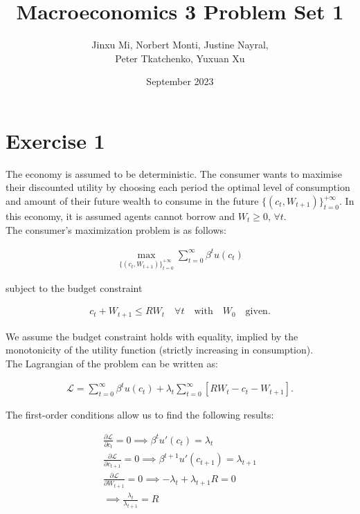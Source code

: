 \documentclass{article}
\title{Macroeconomics 3 Problem Set 1}
\author{Jinxu Mi, Norbert Monti, Justine Nayral, \\ Peter Tkatchenko, Yuxuan Xu}
\date{September 2023}
\begin{document}
\maketitle

\section{Exercise 1}
The economy is assumed to be deterministic. The consumer wants to maximise their discounted utility by choosing each period the optimal level of consumption and amount of their future wealth to consume in the future $\{(c_t, W_{t+1})\}^{+\infty}_{t=0}$. In this economy, it is assumed agents cannot borrow and $W_t \geq 0$, $\forall t$. \\

The consumer's maximization problem is as follows:

\begin{gather*}
    \max_{\{(c_t, W_{t+1})\}^{+\infty}_{t=0}} \sum^\infty_{t=0} \beta^tu(c_t)
\end{gather*}

subject to the budget constraint

\begin{gather*}
    c_t + W_{t+1} \leq RW_t \quad \forall t \quad  \mbox{with} \quad W_0 \quad \mbox{given}.
\end{gather*}

We assume the budget constraint holds with equality, implied by the monotonicity of the utility function (strictly increasing in consumption). \\

The Lagrangian of the problem can be written as:

\begin{gather*}
    \mathcal{L} = \sum^\infty_{t=0} \beta^tu(c_t) + \lambda_t\sum^\infty_{t=0}[RW_t - c_t - W_{t+1}].
\end{gather*}

The first-order conditions allow us to find the following results:

\begin{gather*}
\frac{\partial \mathcal{L}}{\partial c_t} = 0 \implies \beta^tu'(c_t) = \lambda_t \\
\frac{\partial \mathcal{L}}{\partial c_{t+1}} = 0 \implies \beta^{t+1}u'(c_{t+1}) = \lambda_{t+1} \\
\frac{\partial \mathcal{L}}{\partial W_{t+1}} = 0 \implies -\lambda_t + \lambda_{t+1}R = 0 \\
\implies \frac{\lambda_t}{\lambda_{t+1}} = R
\end{gather*}
\end{document}
